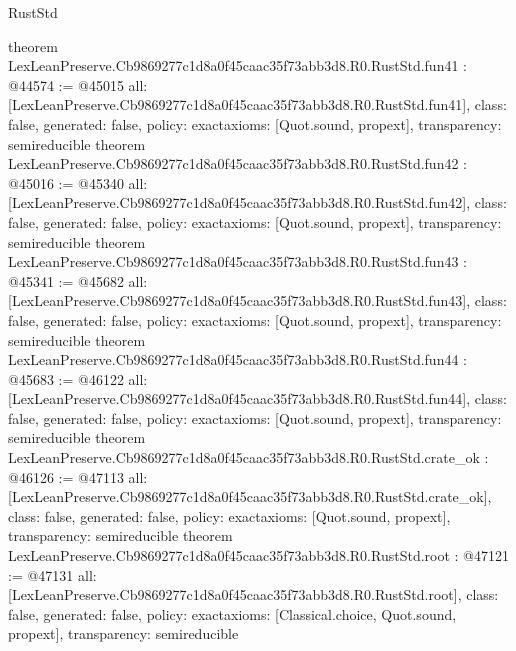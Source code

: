 \begin{lexlean}{RustStd}
\begin{coremodule}
{}
theorem LexLeanPreserve.Cb9869277c1d8a0f45caac35f73abb3d8.R0.RustStd.fun41 : @44574 := @45015 {
  all: [LexLeanPreserve.Cb9869277c1d8a0f45caac35f73abb3d8.R0.RustStd.fun41],
  class: false,
  generated: false,
  policy: exact{axioms: [Quot.sound, propext]},
  transparency: semireducible
}
theorem LexLeanPreserve.Cb9869277c1d8a0f45caac35f73abb3d8.R0.RustStd.fun42 : @45016 := @45340 {
  all: [LexLeanPreserve.Cb9869277c1d8a0f45caac35f73abb3d8.R0.RustStd.fun42],
  class: false,
  generated: false,
  policy: exact{axioms: [Quot.sound, propext]},
  transparency: semireducible
}
theorem LexLeanPreserve.Cb9869277c1d8a0f45caac35f73abb3d8.R0.RustStd.fun43 : @45341 := @45682 {
  all: [LexLeanPreserve.Cb9869277c1d8a0f45caac35f73abb3d8.R0.RustStd.fun43],
  class: false,
  generated: false,
  policy: exact{axioms: [Quot.sound, propext]},
  transparency: semireducible
}
theorem LexLeanPreserve.Cb9869277c1d8a0f45caac35f73abb3d8.R0.RustStd.fun44 : @45683 := @46122 {
  all: [LexLeanPreserve.Cb9869277c1d8a0f45caac35f73abb3d8.R0.RustStd.fun44],
  class: false,
  generated: false,
  policy: exact{axioms: [Quot.sound, propext]},
  transparency: semireducible
}
theorem LexLeanPreserve.Cb9869277c1d8a0f45caac35f73abb3d8.R0.RustStd.crate_ok : @46126 := @47113 {
  all: [LexLeanPreserve.Cb9869277c1d8a0f45caac35f73abb3d8.R0.RustStd.crate_ok],
  class: false,
  generated: false,
  policy: exact{axioms: [Quot.sound, propext]},
  transparency: semireducible
}
theorem LexLeanPreserve.Cb9869277c1d8a0f45caac35f73abb3d8.R0.RustStd.root : @47121 := @47131 {
  all: [LexLeanPreserve.Cb9869277c1d8a0f45caac35f73abb3d8.R0.RustStd.root],
  class: false,
  generated: false,
  policy: exact{axioms: [Classical.choice, Quot.sound, propext]},
  transparency: semireducible
}


\end{coremodule}
\end{lexlean}
